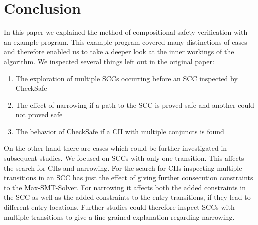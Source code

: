 \section{Conclusion}
\label{sec:conclusion}

In this paper we explained the method of compositional safety verification with an example program.
This example program covered many distinctions of cases and therefore enabled us to take a deeper look at the inner workings of the algorithm.
We inspected several things left out in the original paper:
\begin{enumerate}
\item The exploration of multiple SCCs occurring before an SCC inspected by CheckSafe
\item The effect of narrowing if a path to the SCC is proved safe and another could not proved safe
\item The behavior of CheckSafe if a CII with multiple conjuncts is found
\end{enumerate}

On the other hand there are cases which could be further investigated in subsequent studies.
We focused on SCCs with only one transition.
This affects the search for CIIs and narrowing.
For the search for CIIs inspecting multiple transitions in an SCC has just the effect of giving further consecution constraints to the Max-SMT-Solver.
For narrowing it affects both the added constraints in the SCC as well as the added constraints to the entry transitions, if they lead to different entry locations.
Further studies could therefore inspect SCCs with multiple transitions to give a fine-grained explanation regarding narrowing.
